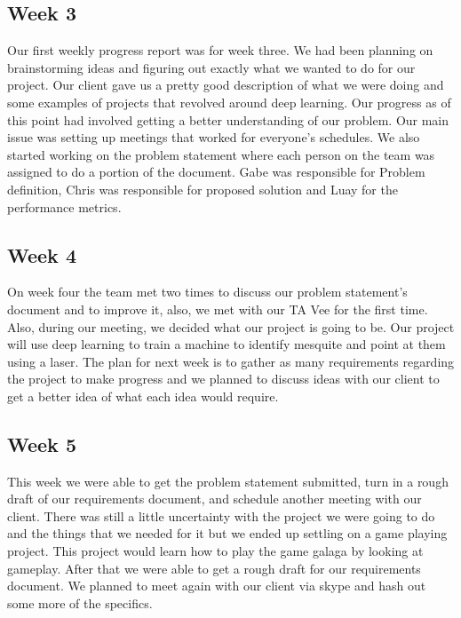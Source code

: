 \documentclass[onecolumn, draftclsnofoot,10pt, compsoc]{IEEEtran}
\begin{document}
\subsection{Week 3}
Our first weekly progress report was for week three.
We had been planning on brainstorming ideas and figuring out exactly what we wanted to do for our project.
Our client gave us a pretty good description of what we were doing and some examples of projects that revolved around deep learning.
Our progress as of this point had involved getting a better understanding of our problem.
Our main issue was setting up meetings that worked for everyone's schedules.
We also started working on the problem statement where each person on the team was assigned to do a portion of the document.
Gabe was responsible for Problem definition, Chris was responsible for proposed solution and Luay for the performance metrics.

\subsection{Week 4}
On week four the team met two times to discuss our problem statement's document and to improve it, also, we met with our TA Vee for the first time.
Also, during our meeting, we decided what our project is going to be.
Our project will use deep learning to train a machine to identify mesquite and point at them using a laser.
The plan for next week is to gather as many requirements regarding the project to make progress and we planned to discuss ideas with our client to get a better idea of what each idea would require.

\subsection{Week 5}
This week we were able to get the problem statement submitted, turn in a rough draft of our requirements document, and schedule another meeting with our client.
There was still a little uncertainty with the project we were going to do and the things that we needed for it but we ended up settling on a game playing project.
This project would learn how to play the game galaga by looking at gameplay.
After that we were able to get a rough draft for our requirements document.
We planned to meet again with our client via skype and hash out some more of the specifics.
\end{document}
